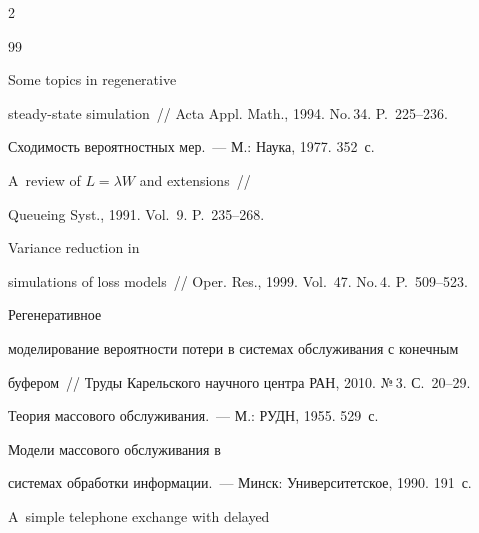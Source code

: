 \begin{multicols}{2}
{{\begin{thebibliography}{99}


 Some topics in regenerative


    steady-state simulation~// Acta Appl. Math.,   1994. No.\,34. P.~225--236.







 Сходимость вероятностных мер.~--- М.: Наука, 1977.  352~с.







 A~review of $L=\lambda W$ and extensions~//


    Queueing Syst.,  1991. Vol.~9. P.~235--268.


    




 Variance reduction in


    simulations of loss models~// Oper. Res., 1999. Vol.~47. No.\,4.     P.~509--523.


    




 Регенеративное


    моделирование вероятности потери в системах обслуживания с конечным


    буфером~// Труды Карельского научного центра РАН, 2010. №\,3. С.~20--29.


    






    Теория массового обслуживания.~--- М.: РУДН, 1955. 529~с.







 Модели массового обслуживания в


    системах обработки информации.~--- Минск: Университетское, 1990. 191~с.







 A~simple telephone exchange with delayed



\end{thebibliography}}}
\end{multicols}
